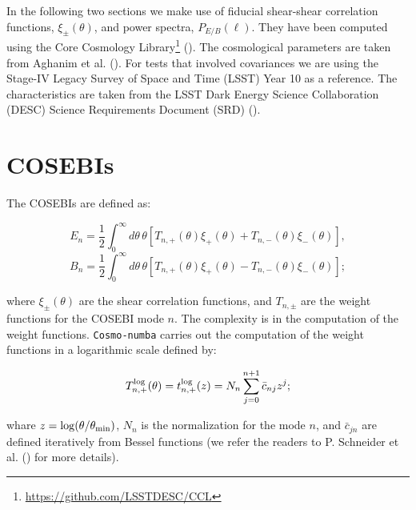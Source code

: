 \documentclass[
]{article}
\begin{document}
In the following two sections we make use of fiducial shear-shear
correlation functions, \(\xi_{\pm}(\theta)\), and power spectra,
\(P_{E/B}(\ell)\). They have been computed using the Core Cosmology
Library\footnote{\url{https://github.com/LSSTDESC/CCL}}
(). The cosmological
parameters are taken from Aghanim et al.
(). For tests that involved covariances
we are using the Stage-IV Legacy Survey of Space and Time (LSST) Year 10
as a reference. The characteristics are taken from the LSST Dark Energy
Science Collaboration (DESC) Science Requirements Document (SRD)
().

\section{COSEBIs}\label{cosebis}

\label{sec:cosebis}

The COSEBIs are defined as:

\begin{equation}
E_{n} = \frac{1}{2} \int_{0}^{\infty} d\theta\, \theta [T_{n,+}(\theta)\xi_{+}(\theta) + T_{n,-}(\theta)\xi_{-}(\theta)],
\end{equation} \begin{equation}
B_{n} = \frac{1}{2} \int_{0}^{\infty} d\theta\, \theta [T_{n,+}(\theta)\xi_{+}(\theta) - T_{n,-}(\theta)\xi_{-}(\theta)];
\end{equation}

where \(\xi_{\pm}(\theta)\) are the shear correlation functions, and
\(T_{n,\pm}\) are the weight functions for the COSEBI mode \(n\). The
complexity is in the computation of the weight functions.
\texttt{Cosmo-numba} carries out the computation of the weight functions
in a logarithmic scale defined by:

\begin{equation}
T_{n,+}^{\rm{log}}(\theta) = t_{n,+}^{\rm{log}}(z) = N_{n}\sum_{j=0}^{n+1}\bar{c}_{nj}z^{j};
\end{equation}

whare \(z = \rm{log}(\theta/\theta_{\rm{min}})\), \(N_{n}\) is the
normalization for the mode \(n\), and \(\bar{c}_{jn}\) are defined
iteratively from Bessel functions (we refer the readers to P. Schneider
et al. () for more details).
\end{document}
